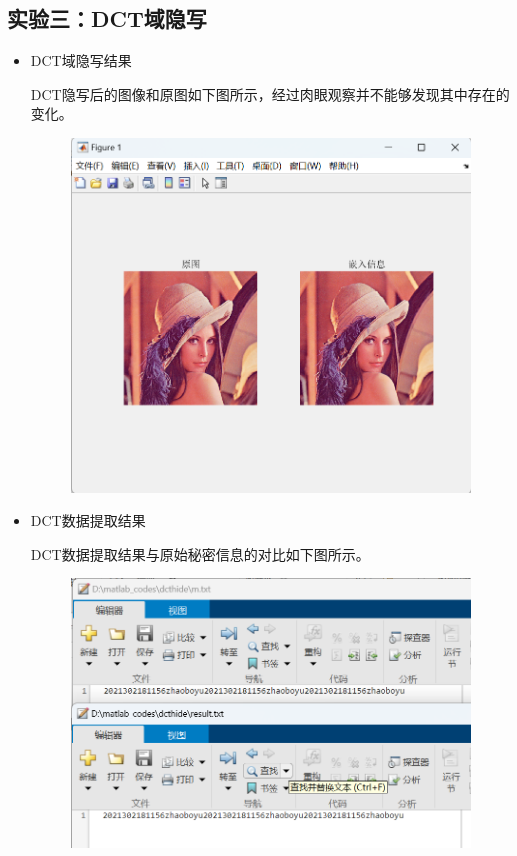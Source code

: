 \documentclass[a4paper,11pt,UTF8]{ctexart}
\newcommand{\bottomcaption}{%
\setlength{\abovecaptionskip}{6pt}%
\setlength{\belowcaptionskip}{6pt}%
\caption}
\newcommand{\xiaowuhao}{\fontsize{9pt}{\baselineskip}\selectfont}   %
\begin{document}
  \subsection{实验三：DCT域隐写}
  \begin{itemize}
    \item DCT域隐写结果\par
      DCT隐写后的图像和原图如下图所示，经过肉眼观察并不能够发现其中存在的变化。\par
      \begin{figure}[!htbp]
      \centering
      \includegraphics[width=\textwidth]{DCThide_result1.png}
      \bottomcaption{\xiaowuhao{DCT隐写前后图像}}
      \end{figure}
\newpage
    \item DCT数据提取结果\par
      DCT数据提取结果与原始秘密信息的对比如下图所示。
        \begin{figure}[!htbp]
        \centering
        \includegraphics[width=\textwidth]{DCTget_result.png}
        \bottomcaption{\xiaowuhao{DCT提取结果}}
        \end{figure}
      

\end{itemize}
\end{document}
